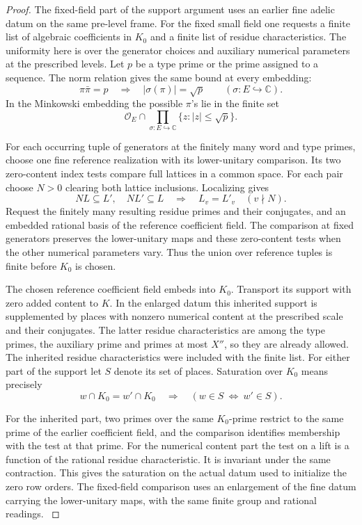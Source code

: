 \begin{proof}
The fixed-field part of the support argument uses an earlier fine
adelic datum on the same pre-level frame. For the fixed small field
one requests a finite list of algebraic coefficients in \(K_0\)
and a finite list of residue characteristics. The uniformity here
is over the generator choices and auxiliary numerical parameters
at the prescribed levels. Let \(p\) be a type prime or the prime
assigned to a sequence. The norm relation gives the same bound at every embedding:
\[
              \pi\bar\pi=p\quad\Longrightarrow\quad
               |\sigma(\pi)|=\sqrt p\qquad(\sigma:E\hookrightarrow\mathbb C).
\] In the
Minkowski embedding the possible \(\pi\)'s lie in the finite set
\[
 \mathcal O_E\cap\prod_{\sigma:E\hookrightarrow\mathbb C}
                          \{z:|z|\le\sqrt p\}.
\]

For each occurring tuple of generators at the finitely many word
and type primes, choose one fine reference realization with its
lower-unitary comparison. Its two zero-content index tests compare
full lattices in a common space. For each pair choose \(N>0\) clearing both lattice inclusions.
Localizing gives
\[
 NL\subseteq L',\quad NL'\subseteq L
        \quad\Longrightarrow\quad L_v=L'_v\quad(v\nmid N).
\] Request the finitely many resulting
residue primes and their conjugates, and an embedded rational basis
of the reference coefficient field. The comparison at fixed generators
preserves the lower-unitary maps and these zero-content tests when
the other numerical parameters vary. Thus the union over reference
tuples is finite before \(K_0\) is chosen.

The chosen reference coefficient field embeds into \(K_0\).
Transport its support with zero added content to \(K\).
In the enlarged datum this inherited support is supplemented by
places with nonzero numerical content at the prescribed scale and
their conjugates. The latter residue characteristics are among the
type primes, the auxiliary prime and primes at most \(X''\), so they are
already allowed. The inherited residue characteristics were included
with the finite list. For either part of the support let \(S\) denote its set of places. Saturation over \(K_0\) means precisely
\[
 w\cap K_0=w'\cap K_0\quad\Longrightarrow\quad(w\in S\ \Longleftrightarrow\ w'\in S).
\]

For the inherited part, two primes over the same \(K_0\)-prime
restrict to the same prime of the earlier coefficient field, and
the comparison identifies membership with the test at that prime.
For the numerical content part the test on a lift is a function
of the rational residue characteristic. It is invariant under
the same contraction. This gives the saturation on the
actual datum used to initialize the zero row orders. The fixed-field
comparison uses an enlargement of the fine datum carrying the
lower-unitary maps, with the same finite group and rational readings.
\label{cor:automorphic-realization-14}
\end{proof}

